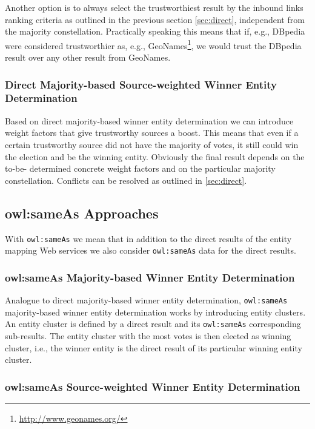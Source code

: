\documentclass[twocolumn]{article}
\begin{document}
Another option is to always select the trustworthiest result by the inbound links ranking criteria as outlined in the
previous section \ref{sec:direct}, independent from the majority constellation. Practically speaking this means that
if, e.g., DBpedia were considered trustworthier as, e.g.,  GeoNames\footnote{\url{http://www.geonames.org/}}, we would
trust  the DBpedia result over any other result from GeoNames.

\subsubsection{Direct Majority-based Source-weighted Winner Entity Determination}

Based on direct majority-based winner entity determination we can introduce weight factors that give trustworthy
sources a boost. This means that even if a certain trustworthy source did not have the majority of votes, it still
could win the election and be the winning entity. Obviously the final result depends on the to-be- determined concrete
weight factors and on the particular majority constellation. Conflicts can be resolved as outlined in \ref{sec:direct}.

\subsection{owl:sameAs Approaches}

With \texttt{owl:sameAs} we mean that in addition to the direct results of the entity mapping Web services we also
consider \texttt{owl:sameAs} data for the direct results.

\subsubsection{owl:sameAs Majority-based Winner Entity Determination}\label{sec:owlsameas}

Analogue to direct majority-based winner entity determination, \texttt{owl:sameAs} majority-based winner entity
determination works by introducing entity clusters. An entity cluster is defined by a direct result and its
\texttt{owl:sameAs} corresponding sub-results. The entity cluster with the most votes is then elected as winning
cluster, i.e., the winner entity is the direct result of its particular winning entity cluster.

\subsubsection{owl:sameAs Source-weighted Winner Entity Determination}
\end{document}
